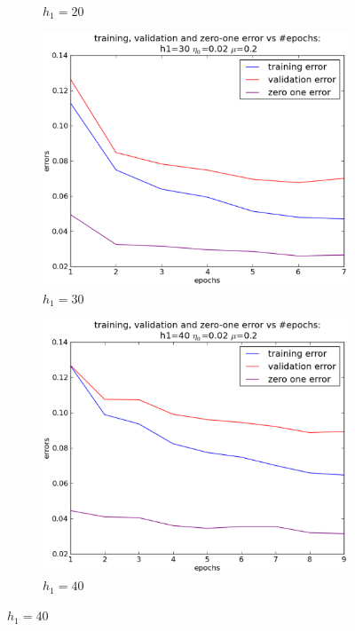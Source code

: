 \begin{itemize}
\begin{figure}[!ht]
\begin{subfigure}[b]{.4\textwidth}
		\caption{$h_1=20$}
		\label{fig:h120}
		\end{subfigure}
		\quad
		\begin{subfigure}[b]{.4\textwidth}
		\centering
		\includegraphics[width=\textwidth]{mlp/plots/effects/30h1.eps}
		\caption{$h_1=30$}
		\end{subfigure}
		\label{fig:h130}
		\quad
		\begin{subfigure}[b]{.4\textwidth}
		\centering
		\includegraphics[width=\textwidth]{mlp/plots/effects/40h1.eps}
		\caption{$h_1=40$}
		\end{subfigure}

\end{figure}
\end{itemize}
